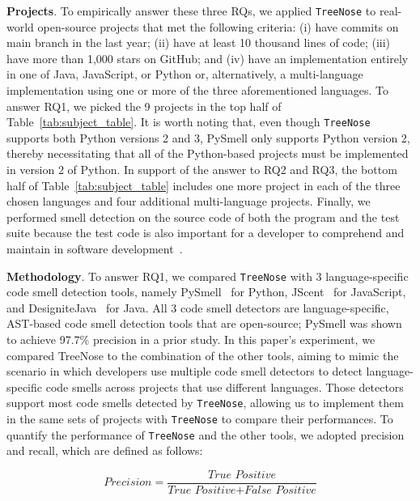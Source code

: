 {\bf Projects}. To empirically answer these three RQs, we applied
\texttt{TreeNose} to real-world open-source projects that met the following
criteria: (i) have commits on main branch in the last year; (ii) have at least
10 thousand lines of code; (iii) have more than 1,000 stars on GitHub; and (iv)
have an implementation entirely in one of Java, JavaScript, or Python or,
alternatively, a multi-language implementation using one or more of the three
aforementioned languages.
%
To answer RQ1, we picked the 9 projects in the top half of
Table~\ref{tab:subject_table}.
%
It is worth noting that, even though \texttt{TreeNose} supports both Python
versions 2 and 3, PySmell only supports Python version 2, thereby necessitating
that all of the Python-based projects must be implemented in version 2 of
Python.
%
In support of the answer to RQ2 and RQ3, the bottom half of
Table~\ref{tab:subject_table} includes one more project in each of the three
chosen languages and four additional multi-language projects.
%
Finally, we performed smell detection on the source code of both the program
and the test suite because the test code is also important for a developer to
comprehend and maintain in software development~\cite{ML}.



{\bf Methodology}. To answer RQ1, we compared \texttt{TreeNose} with 3
language-specific code smell detection tools, namely PySmell~\cite{Pysmell} for
Python, JScent~\cite{Jscent} for JavaScript, and
DesigniteJava~\cite{DesigniteJava} for Java. All 3 code smell detectors are
language-specific, AST-based code smell detection tools that are open-source;
PySmell was shown to achieve 97.7\% precision in a prior study.
%
In this paper's experiment, we compared TreeNose to the combination of the
other tools, aiming to mimic the scenario in which developers use multiple code
smell detectors to detect language-specific code smells across projects that
use different languages.
%
Those detectors support most code smells detected by \texttt{TreeNose},
allowing us to implement them in the same sets of projects with
\texttt{TreeNose} to compare their performances. To quantify the performance of
\texttt{TreeNose} and the other tools, we adopted precision and recall, which
are defined as follows:


\begin{equation}
    \textit{Precision} = \frac{\textit{True Positive}}{\textit{True Positive} + \textit{False Positive}}
\end{equation}

